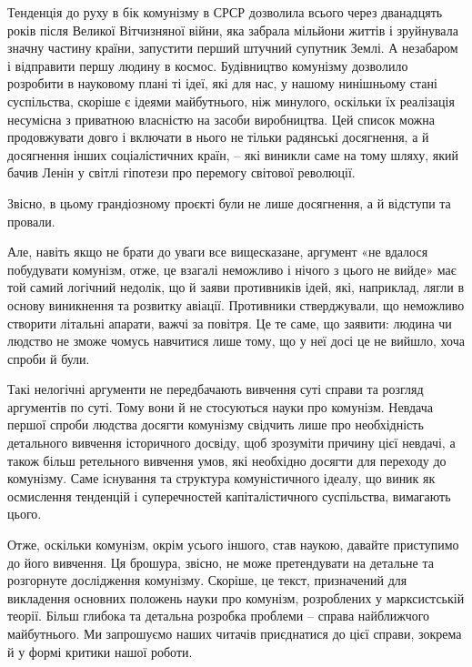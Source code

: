 \documentclass[../main]{subfiles}
\begin{document}
Тенденція до руху в бік комунізму в СРСР дозволила всього через дванадцять років після Великої Вітчизняної війни, яка забрала мільйони життів і зруйнувала значну частину країни, запустити перший штучний супутник Землі. А незабаром і відправити першу людину в космос. Будівництво комунізму дозволило розробити в науковому плані ті ідеї, які для нас, у нашому нинішньому стані суспільства, скоріше є ідеями майбутнього, ніж минулого, оскільки їх реалізація несумісна з приватною власністю на засоби виробництва. Цей список можна продовжувати довго і включати в нього не тільки радянські досягнення, а й досягнення інших соціалістичних країн, – які виникли саме на тому шляху, який бачив Ленін у світлі гіпотези про перемогу світової революції.

Звісно, в цьому грандіозному проєкті були не лише досягнення, а й відступи та провали.

Але, навіть якщо не брати до уваги все вищесказане, аргумент «не вдалося побудувати комунізм, отже, це взагалі неможливо і нічого з цього не вийде» має той самий логічний недолік, що й заяви противників ідей, які, наприклад, лягли в основу виникнення та розвитку авіації. Противники стверджували, що неможливо створити літальні апарати, важчі за повітря. Це те саме, що заявити: людина чи людство не зможе чомусь навчитися лише тому, що у неї досі це не вийшло, хоча спроби й були.

Такі нелогічні аргументи не передбачають вивчення суті справи та розгляд аргументів по суті. Тому вони й не стосуються науки про комунізм. Невдача першої спроби людства досягти комунізму свідчить лише про необхідність детального вивчення історичного досвіду, щоб зрозуміти причину цієї невдачі, а також більш ретельного вивчення умов, які необхідно досягти для переходу до комунізму. Саме існування та структура комуністичного ідеалу, що виник як осмислення тенденцій і суперечностей капіталістичного суспільства, вимагають цього.

Отже, оскільки комунізм, окрім усього іншого, став наукою, давайте приступимо до його вивчення. Ця брошура, звісно, не може претендувати на детальне та розгорнуте дослідження комунізму. Скоріше, це текст, призначений для викладення основних положень науки про комунізм, розроблених у марксистській теорії. Більш глибока та детальна розробка проблеми – справа найближчого майбутнього. Ми запрошуємо наших читачів приєднатися до цієї справи, зокрема й у формі критики нашої роботи.
\end{document}
